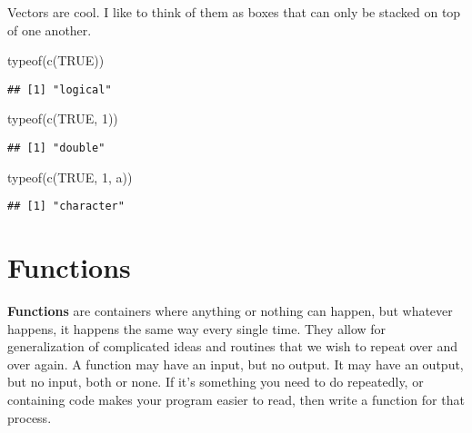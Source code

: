 \documentclass[
]{book}
\newenvironment{Shaded}{\begin{snugshade}}{\end{snugshade}}
\newcommand{\ConstantTok}[1]{\textcolor[rgb]{0.00,0.00,0.00}{#1}}
\newcommand{\DecValTok}[1]{\textcolor[rgb]{0.00,0.00,0.81}{#1}}
\newcommand{\FunctionTok}[1]{\textcolor[rgb]{0.00,0.00,0.00}{#1}}
\newcommand{\NormalTok}[1]{#1}
\newcommand{\StringTok}[1]{\textcolor[rgb]{0.31,0.60,0.02}{#1}}
\begin{document}
Vectors are cool. I like to think of them as boxes that can only be stacked on top of one another.

\begin{Shaded}
\begin{Highlighting}[]
\FunctionTok{typeof}\NormalTok{(}\FunctionTok{c}\NormalTok{(}\ConstantTok{TRUE}\NormalTok{))}
\end{Highlighting}
\end{Shaded}

\begin{verbatim}
## [1] "logical"
\end{verbatim}

\begin{Shaded}
\begin{Highlighting}[]
\FunctionTok{typeof}\NormalTok{(}\FunctionTok{c}\NormalTok{(}\ConstantTok{TRUE}\NormalTok{, }\DecValTok{1}\NormalTok{))}
\end{Highlighting}
\end{Shaded}

\begin{verbatim}
## [1] "double"
\end{verbatim}

\begin{Shaded}
\begin{Highlighting}[]
\FunctionTok{typeof}\NormalTok{(}\FunctionTok{c}\NormalTok{(}\ConstantTok{TRUE}\NormalTok{, }\DecValTok{1}\NormalTok{, }\StringTok{\textquotesingle{}a\textquotesingle{}}\NormalTok{))}
\end{Highlighting}
\end{Shaded}

\begin{verbatim}
## [1] "character"
\end{verbatim}

\hypertarget{functions-1}{%
\section{Functions}\label{functions-1}}

\textbf{Functions} are containers where anything or nothing can happen, but whatever happens, it happens the same way every single time. They allow for generalization of complicated ideas and routines that we wish to repeat over and over again. A function may have an input, but no output. It may have an output, but no input, both or none. If it's something you need to do repeatedly, or containing code makes your program easier to read, then write a function for that process.
\end{document}
